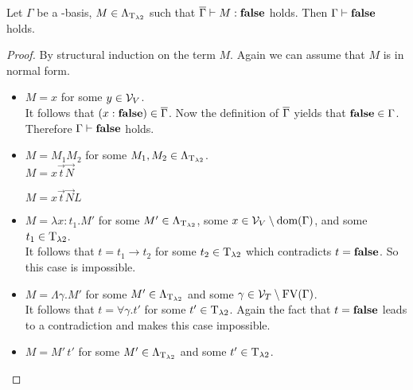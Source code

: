 \begin{lemma}
Let $\Gamma$ be a \SysP-basis, $M\in\Lambda_{\text{T}_{\lambda2}}$ such that $\overline{\Gamma}\vdash M:\textbf{false}$ holds. Then $\Gamma\vdash\textbf{false}$ holds.
\end{lemma}
\begin{proof}
By structural induction on the term $M$.
Again we can assume that $M$ is in normal form.
\begin{itemize}
	\item[] \underline{$M=x$} for some $y\in\mathcal{V}_V$.\\
		It follows that $(x:\textbf{false})\in\overline{\Gamma}$. Now the definition of $\overline{\Gamma}$ yields that $\textbf{false}\in\Gamma$. Therefore $\Gamma\vdash \textbf{false}$ holds.
	\item[] \underline{$M=M_1M_2$} for some $M_1,M_2\in\Lambda_{\text{T}_{\lambda2}}$.\\
		
		$M=x\vec{t}\vec{N}$
		\begin{figure}[H]
			\centering
			
		\end{figure}
		
		$M=x\vec{t}\vec{N}L$
		\begin{figure}[H]
			\centering
			
		\end{figure}
	\item[] \underline{$M=\lambda x:t_1.M'$} for some $M'\in\Lambda_{\text{T}_{\lambda2}}$, some $x\in\mathcal{V}_V\setminus\text{dom}(\Gamma)$, and some $t_1\in\text{T}_{\lambda2}$.\\
		It follows that $t=t_1\to t_2$ for some $t_2\in\text{T}_{\lambda2}$ which contradicts $t=\textbf{false}$. So this case is impossible.

	\item[] \underline{$M=\Lambda\gamma.M'$} for some $M'\in\Lambda_{\text{T}_{\lambda2}}$ and some $\gamma\in\mathcal{V}_T\setminus\text{FV}(\Gamma)$.\\
		It follows that $t=\forall\gamma.t'$ for some $t'\in\text{T}_{\lambda2}$. Again the fact that $t=\textbf{false}$ leads to a contradiction and makes this case impossible.
		

	\item[] \underline{$M=M'\,t'$} for some $M'\in\Lambda_{\text{T}_{\lambda2}}$ and some $t'\in\text{T}_{\lambda2}$.\\
		
\end{itemize}
\end{proof}